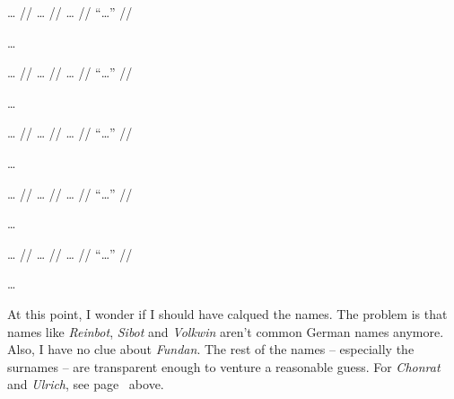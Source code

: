 \documentclass[12pt,paper=a4]{scrartcl}
\newcommand{\fw}[1]{\textit{#1}} %
\begin{document}
\ex \begingl
	\glpreamble … //
	\gla … //
	\glb … //
	\glft \enquote{…} //
\endgl \xe

…


\ex \begingl
	\glpreamble … //
	\gla … //
	\glb … //
	\glft \enquote{…} //
\endgl \xe

…


\ex \begingl
	\glpreamble … //
	\gla … //
	\glb … //
	\glft \enquote{…} //
\endgl \xe

…


\ex \begingl
	\glpreamble … //
	\gla … //
	\glb … //
	\glft \enquote{…} //
\endgl \xe

…


\ex \begingl
	\glpreamble … //
	\gla … //
	\glb … //
	\glft \enquote{…} //
\endgl \xe

…

At this point, I wonder if I should have calqued the names. The problem is that 
names like \fw{Reinbot}, \fw{Sibot} and \fw{Volkwin} aren't common German names 
anymore. Also, I have no clue about \fw{Fundan}. The rest of the names -- 
especially the surnames -- are transparent enough to venture a reasonable guess.
For \fw{Chonrat} and \fw{Ulrich}, see page~\pageref{names1} above.
\end{document}

